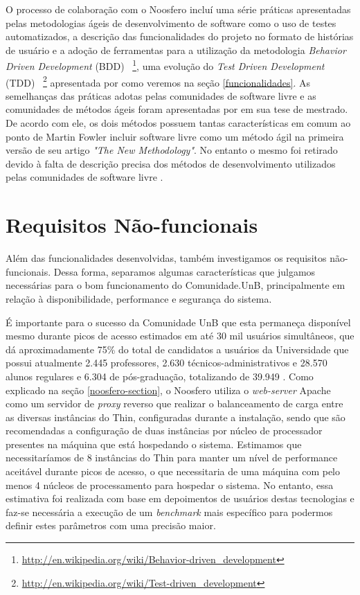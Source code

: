 O processo de colaboração com o Noosfero incluí uma série práticas apresentadas
pelas metodologias ágeis de desenvolvimento de software como o uso de testes
automatizados, a descrição das funcionalidades do projeto no formato de
histórias de usuário e a adoção de ferramentas para a utilização da metodologia
\textit{Behavior Driven Development} (BDD)%
~\footnote{\url{http://en.wikipedia.org/wiki/Behavior-driven_development}},
uma evolução do \textit{Test Driven Development} (TDD)%
~\footnote{\url{http://en.wikipedia.org/wiki/Test-driven_development}}
apresentada por  como veremos na seção
\ref{funcionalidades}.
%
As semelhanças das práticas adotas pelas comunidades de software livre e as
comunidades de métodos ágeis foram apresentadas por 
em sua tese de mestrado. De acordo com ele, os dois
métodos possuem tantas características em comum ao ponto de Martin Fowler
incluir software livre como um método ágil na primeira versão de seu artigo
\textit{"The New Methodology"}. No entanto o mesmo foi retirado devido
à falta de descrição precisa dos métodos de desenvolvimento utilizados pelas
comunidades de software livre .


\section{Requisitos Não-funcionais}

Além das funcionalidades desenvolvidas, também investigamos os requisitos
não-funcionais. Dessa forma, separamos algumas características que
julgamos necessárias para o bom funcionamento do Comunidade.UnB, principalmente
em relação à disponibilidade, performance e segurança do sistema.

É importante para o sucesso da Comunidade UnB que esta permaneça disponível
mesmo durante picos de acesso estimados em até 30 mil usuários simultâneos,
que dá aproximadamente 75\% do total de candidatos a usuários da Universidade
que possui atualmente 2.445 professores, 2.630 técnicos-administrativos
e 28.570 alunos regulares e 6.304 de pós-graduação, totalizando de 39.949
\cite{unbInstituicao}. Como explicado na seção \ref{noosfero-section}, o Noosfero
utiliza o \textit{web-server} Apache como um servidor de \textit{proxy} reverso
que realizar o balanceamento de carga entre as diversas instâncias do Thin,
configuradas durante a instalação, sendo que são recomendadas a configuração de
duas instâncias por núcleo de processador presentes na máquina que está
hospedando o sistema.
%
Estimamos que necessitaríamos de 8 instâncias do Thin
para manter um nível de performance aceitável durante picos de acesso, o que
necessitaria de uma máquina com pelo menos 4 núcleos de processamento para
hospedar o sistema. No entanto, essa estimativa foi realizada com base em
depoimentos de usuários destas tecnologias e faz-se necessária a execução de
um \textit{benchmark} mais específico para podermos definir estes parâmetros com
uma precisão maior.

